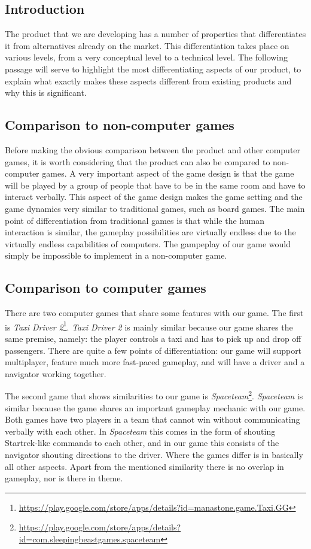 

\subsection{Introduction}
The product that we are developing has a number of properties that differentiates it from alternatives already on the market. This differentiation takes place on various levels, from a very conceptual level to a technical level. The following passage will serve to highlight the most differentiating aspects of our product, to explain what exactly makes these aspects different from existing products and why this is significant.

\subsection{Comparison to non-computer games}
Before making the obvious comparison between the product and other computer games, it is worth considering that the product can also be compared to non-computer games. A very important aspect of the game design is that the game will be played by a group of people that have to be in the same room and have to interact verbally. This aspect of the game design makes the game setting and the game dynamics very similar to traditional games, such as board games. The main point of differentiation from traditional games is that while the human interaction is similar, the gameplay possibilities are virtually endless due to the virtually endless capabilities of computers. The gampeplay of our game would simply be impossible to implement in a non-computer game.

\subsection{Comparison to computer games}
There are two computer games that share some features with our game. The first is \emph{Taxi Driver 2}\footnote{\url{https://play.google.com/store/apps/details?id=manastone.game.Taxi.GG}}. \emph{Taxi Driver 2} is mainly similar because our game shares the same premise, namely: the player controls a taxi and has to pick up and drop off passengers. There are quite a few points of differentiation: our game will support multiplayer, feature much more fast-paced gameplay, and will have a driver and a navigator working together.

The second game that shows similarities to our game is \emph{Spaceteam}\footnote{\url{https://play.google.com/store/apps/details?id=com.sleepingbeastgames.spaceteam}}. \emph{Spaceteam} is similar because the game shares an important gameplay mechanic with our game. Both games have two players in a team that cannot win without communicating verbally with each other. In \emph{Spaceteam} this comes in the form of shouting Startrek-like commands to each other, and in our game this consists of the navigator shouting directions to the driver. Where the games differ is in basically all other aspects. Apart from the mentioned similarity there is no overlap in gameplay, nor is there in theme.

